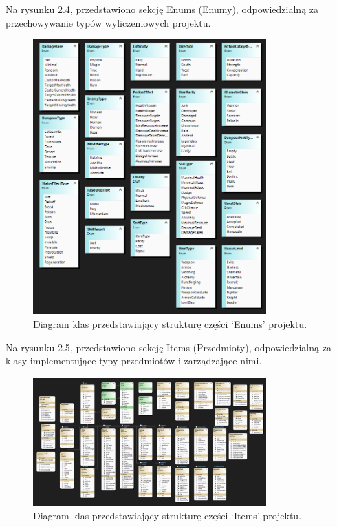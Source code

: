 \begin{itemize}
    \begin{minipage}{\linewidth}%
    \item Na rysunku 2.4, przedstawiono sekcję Enums (Enumy), odpowiedzialną za przechowywanie typów wyliczeniowych projektu.
        \begin{figure}[H]
        \centering
        \includegraphics[width=0.8\textwidth]{figures/class_diagram_enums.png}
        \caption{Diagram klas przedstawiający strukturę części `Enums' projektu.}
        \label{fig:class_diagram_enums}
        \end{figure}
    \end{minipage}

    \begin{minipage}{\linewidth}%
    \item Na rysunku 2.5, przedstawiono sekcję Items (Przedmioty), odpowiedzialną za klasy implementujące typy przedmiotów i zarządzające nimi.
        \begin{figure}[H]
        \centering
        \includegraphics[width=0.8\textwidth]{figures/class_diagram_items.png}
        \caption{Diagram klas przedstawiający strukturę części `Items' projektu.}
        \label{fig:class_diagram_items}
        \end{figure}
    \end{minipage}


\end{itemize}
